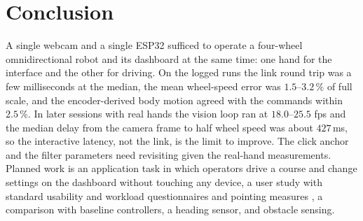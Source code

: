 \documentclass[5p,twocolumn]{elsarticle}
\begin{document}
\section{Conclusion}\label{sec:conclusion}
A single webcam and a single ESP32 sufficed to operate a four-wheel omnidirectional robot and its dashboard at the same time: one hand for the interface and the other for driving. On the logged runs the link round trip was a few milliseconds at the median, the mean wheel-speed error was $1.5$--$3.2\,\%$ of full scale, and the encoder-derived body motion agreed with the commands within $2.5\,\%$. In later sessions with real hands the vision loop ran at $18.0$--$25.5$ fps and the median delay from the camera frame to half wheel speed was about $427$\,ms, so the interactive latency, not the link, is the limit to improve. The click anchor and the filter parameters need revisiting given the real-hand measurements. Planned work is an application task in which operators drive a course and change settings on the dashboard without touching any device, a user study with standard usability and workload questionnaires \cite{brooke1996,hart1988} and pointing measures \cite{mackenzie1992}, a comparison with baseline controllers, a heading sensor, and obstacle sensing.
\end{document}
